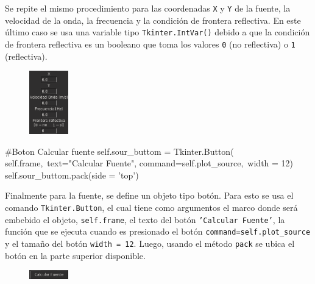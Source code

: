 Se repite el mismo procedimiento para las coordenadas \texttt{X} y \texttt{Y}
de la fuente, la velocidad de la onda, la frecuencia y la condición de 
frontera reflectiva. En este último caso se usa una variable tipo 
\texttt{Tkinter.IntVar()} debido a que la condición de frontera reflectiva
es un booleano que toma los valores \texttt{0} (no reflectiva) o \texttt{1}
(reflectiva).


\begin{figure}[htbp]
	\centering
	\includegraphics[width=0.15\textwidth]
	{./pictures/environment_source.png}
	\label{fig:env_source}
\end{figure}


\begin{listing}[style=python, numbers = none]
    #Boton Calcular fuente
    self.sour_buttom = Tkinter.Button( self.frame,\
    text="Calcular Fuente", command=self.plot_source,\
    width = 12)
    self.sour_buttom.pack(side = 'top')
\end{listing}
Finalmente para la fuente, se define un objeto tipo botón. Para esto se
usa el comando \texttt{Tkinter.Button}, el cual tiene como argumentos el 
marco donde será embebido el objeto, \texttt{self.frame}, el texto del 
botón \texttt{'Calcular Fuente'}, la función que se ejecuta cuando es 
presionado el botón \texttt{command=self.plot\_source} y el tamaño del 
botón \texttt{width = 12}. Luego, usando el método \texttt{pack} se ubica 
el botón en la parte superior disponible.

\begin{figure}[htbp]
	\centering
	\includegraphics[width=0.15\textwidth]
	{./pictures/environment_button1.png}
	\label{fig:env_button1}
\end{figure}


